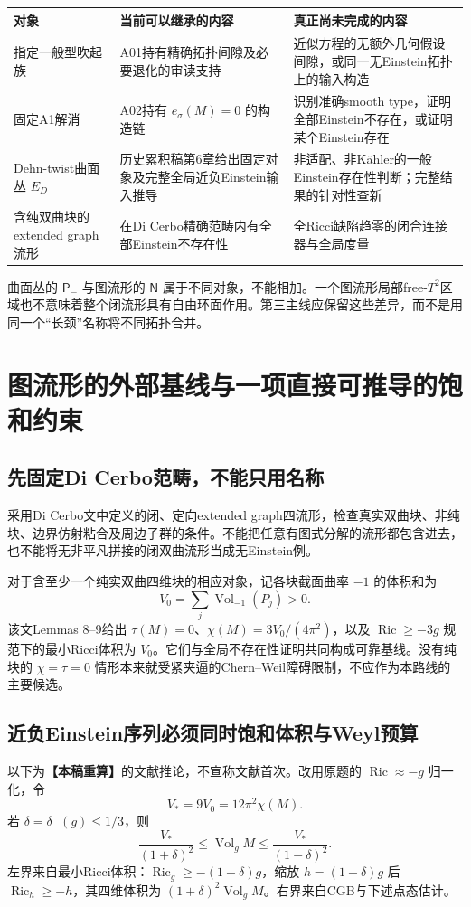 \documentclass[UTF8,a4paper,11pt,fontset=fandol]{ctexart}
\numberwithin{equation}{section}
\theoremstyle{definition}
\newcommand{\Ric}{\operatorname{Ric}}
\newcommand{\Vol}{\operatorname{Vol}}
\newcommand{\status}[1]{\textbf{【#1】}}
\begin{document}
\begin{longtable}{L{.22\textwidth}L{.34\textwidth}L{.35\textwidth}}
\toprule 对象 & 当前可以继承的内容 & 真正尚未完成的内容\\\midrule\endhead
指定一般型吹起族 & A01持有精确拓扑间隙及必要退化的审读支持 & 近似方程的无额外几何假设间隙，或同一无Einstein拓扑上的输入构造\\
固定A1解消 & A02持有 $e_\sigma(M)=0$ 的构造链 & 识别准确smooth type，证明全部Einstein不存在，或证明某个Einstein存在\\
Dehn-twist曲面丛 $E_D$ & 历史累积稿第6章给出固定对象及完整全局近负Einstein输入推导 & 非适配、非K\"ahler的一般Einstein存在性判断；完整结果的针对性查新\\
含纯双曲块的extended graph流形 & 在Di Cerbo精确范畴内有全部Einstein不存在性 & 全Ricci缺陷趋零的闭合连接器与全局度量\\\bottomrule
\end{longtable}
曲面丛的 $\mathsf P_-$ 与图流形的 $\mathsf N$ 属于不同对象，不能相加。一个图流形局部free-$T^2$区域也不意味着整个闭流形具有自由环面作用。第三主线应保留这些差异，而不是用同一个“长颈”名称将不同拓扑合并。

\section{图流形的外部基线与一项直接可推导的饱和约束}
\subsection{先固定Di Cerbo范畴，不能只用名称}
采用Di Cerbo文中定义的闭、定向extended graph四流形，检查真实双曲块、非纯块、边界仿射粘合及周边子群的条件\cite{DiCerbo}。不能把任意有图式分解的流形都包含进去，也不能将无非平凡拼接的闭双曲流形当成无Einstein例。

对于含至少一个纯实双曲四维块的相应对象，记各块截面曲率 $-1$ 的体积和为
\[
V_0=\sum_j\Vol_{-1}(P_j)>0.
\]
该文Lemmas 8--9给出 $\tau(M)=0$、$\chi(M)=3V_0/(4\pi^2)$，以及 $\Ric\ge-3g$ 规范下的最小Ricci体积为 $V_0$。它们与全局不存在性证明共同构成可靠基线。没有纯块的 $\chi=\tau=0$ 情形本来就受紧夹逼的Chern--Weil障碍限制，不应作为本路线的主要候选。

\subsection{近负Einstein序列必须同时饱和体积与Weyl预算}
以下为\status{本稿重算}的文献推论，不宣称文献首次。改用原题的 $\Ric\approx-g$ 归一化，令
\[
V_*=9V_0=12\pi^2\chi(M).
\]
若 $\delta=\delta_-(g)\le1/3$，则
\begin{equation}\label{eq:graphvol}
\boxed{\frac{V_*}{(1+\delta)^2}\le\Vol_gM
\le\frac{V_*}{(1-\delta)^2}.}
\end{equation}
左界来自最小Ricci体积：$\Ric_g\ge-(1+\delta)g$，缩放 $h=(1+\delta)g$ 后 $\Ric_h\ge-h$，其四维体积为 $(1+\delta)^2\Vol_gM$。右界来自CGB与下述点态估计。
\end{document}
